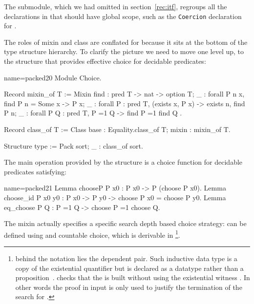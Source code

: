 The  submodule, which we had omitted in section~\ref{rec:itf},
regroups all the declarations in  that should have global scope,
such as the \lstinline/Coercion/ declaration for .

The roles of mixin and class are conflated for 
because it sits at the bottom of the type structure hierarchy. To
clarify the picture we need to move one level up, to the
 structure that provides effective choice for decidable
predicates:

\begin{coq}{name=packed20}{}
Module Choice.

Record mixin_of T := Mixin {
  find : pred T -> nat -> option T;
  _ : forall P n x, find P n = Some x -> P x;
  _ : forall P : pred T, (exists x, P x) -> exists n, find P n;
  _ : forall P Q : pred T, P =1 Q -> find P =1 find Q
}.

Record class_of T :=
  Class {base : Equality.class_of T; mixin : mixin_of T}.

Structure type := Pack {sort; _ : class_of sort}.
\end{coq}


The main operation provided by the  structure  is a
choice function for decidable predicates  satisfying:

\begin{coq}{name=packed21}{}
Lemma chooseP P x0 : P x0 -> P (choose P x0).
Lemma choose_id P x0 y0 : P x0 -> P y0 -> choose P x0 = choose P y0.
Lemma eq_choose P Q : P =1 Q -> choose P =1 choose Q.
\end{coq}

The mixin actually specifies a specific search depth based choice
strategy:  can be defined using  and countable
choice, which is derivable in \mcbCIC{}\footnote{behind the
 notation lies the  dependent pair.  Such inductive
data type is a copy of the existential quantifier but is
declared as a datatype rather than a
proposition~\cite[section 3.1.4]{Coq:manual}.
\Coq{} checks that the  is built without using
the existential witness .  In other words the proof in
input is only used to justify the termination of the
search for .}.

